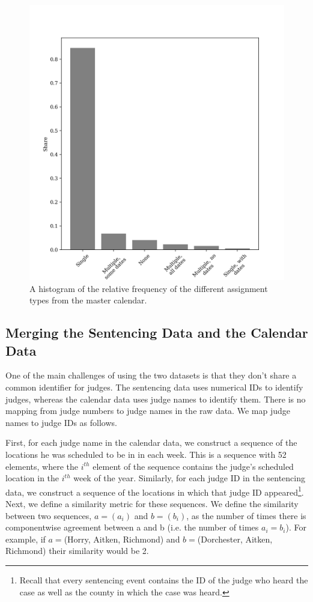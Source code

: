 \documentclass[11pt, oneside]{article}   	%
\theoremstyle{ModifiedStyle}
\begin{document}
			\begin{figure}[H]
				\centering
				\includegraphics[scale=0.55]{../../output/figures/Description/assignment_type_hist.png}
				\caption{A histogram of the relative frequency of the different assignment types from the master calendar.}
				\label{assignment_type_hist}
			\end{figure}

  \subsection{Merging the Sentencing Data and the Calendar Data}
	  \label{mapping-judge-names}
		One of the main challenges of using the two datasets is that they don't share a common identifier for judges. The sentencing data uses numerical IDs to identify judges, whereas the calendar data uses judge names to identify them. There is no mapping from judge numbers to judge names in the raw data. We map judge names to judge IDs as follows.

		First, for each judge name in the calendar data, we construct a sequence of the locations he was scheduled to be in in each week. This is a sequence with 52 elements, where the $i^{th}$ element of the sequence contains the judge's scheduled location in the $i^{th}$ week of the year. Similarly, for each judge ID in the sentencing data, we construct a sequence of the locations in which that judge ID appeared\footnote{Recall that every sentencing event contains the ID of the judge who heard the case as well as the county in which the case was heard.}. Next, we define a similarity metric for these sequences. We define the similarity between two sequences, $a = (a_i)$ and $b=(b_i)$, as the number of times there is componentwise agreement between a and b (i.e. the number of times $a_i = b_i$). For example, if $a = $(Horry, Aitken, Richmond) and $b = $(Dorchester, Aitken, Richmond) their similarity would be 2.
\end{document}

